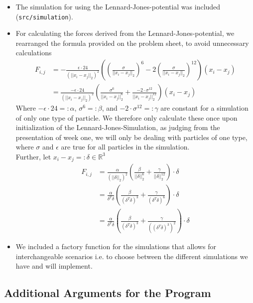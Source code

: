 \documentclass{article}
\begin{document}
\begin{itemize}
    \item The simulation for using the Lennard-Jones-potential was included (\verb|src/simulation|).
    \item For calculating the forces derived from the Lennard-Jones-potential, we rearranged the formula provided on the problem sheet, to avoid unnecessary calculations
    \begin{align}
        F_{i,j} &= -\frac{\epsilon \cdot 24}{(||x_i-x_j||_2)^2} \left( \left( \frac{\sigma}{||x_i-x_j||_2} \right) ^6 - 2 \left( \frac{\sigma}{||x_i-x_j||_2} \right) ^{12} \right) (x_i-x_j) \\
                &= \frac{-\epsilon \cdot 24}{(||x_i-x_j||_2)^2} \left(  \frac{\sigma ^6 }{||x_i-x_j||_2 ^6 } + \frac{-2 \cdot \sigma^{12}}{||x_i-x_j||_2^{12}}  \right) (x_i-x_j)
    \end{align}
    Where  $-\epsilon \cdot 24 =: \alpha$, $\sigma ^6 =: \beta$, and $-2 \cdot \sigma^{12} =: \gamma$ are constant for a simulation of only one type of particle. We therefore only calculate these once upon initialization of the Lennard-Jones-Simulation, as judging from the presentation of week one, we will only be dealing with particles of one type, where $\sigma$ and $\epsilon$ are true for all particles in the simulation. \\
    Further, let $x_i-x_j =: \delta \in \mathbb{R}^3$
    \begin{align}
        F_{i,j} &= \frac{\alpha}{(||\delta||_2)^2} \left(  \frac{\beta}{||\delta||_2 ^6 } + \frac{\gamma}{||\delta||_2^{12}}  \right) \cdot \delta \\
        &= \frac{\alpha}{\delta ^T\delta} \left(  \frac{\beta}{(\delta ^T\delta) ^3} + \frac{\gamma}{(\delta ^T\delta) ^6}  \right) \cdot \delta \\
        &= \frac{\alpha}{\delta ^T\delta} \left(  \frac{\beta}{(\delta ^T\delta) ^3} + \frac{\gamma}{((\delta ^T\delta) ^3) ^2}  \right) \cdot \delta
    \end{align} 
    \item We included a factory function for the simulations that allows for interchangeable scenarios i.e. to choose between the different simulations we have and will implement.
\end{itemize}

\subsection{Additional Arguments for the Program}
\label{subsec:arg}
\end{document}
